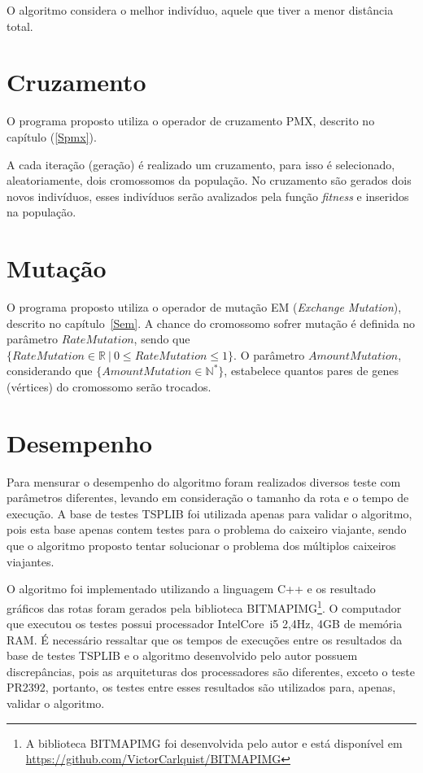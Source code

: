 \documentclass[12pt,openright,a4paper,oneside]{tcc}
\begin{document}
		O algoritmo considera o melhor indivíduo, aquele que tiver a menor distância total. 

		\section{Cruzamento}

			O programa proposto utiliza o operador de cruzamento PMX, descrito no capítulo (\ref{Spmx}). 
			
			A cada iteração (geração) é realizado um cruzamento, para isso é selecionado, aleatoriamente, dois cromossomos da população. No cruzamento são gerados dois novos indivíduos, esses indivíduos serão avalizados pela função \textit{fitness} e inseridos na população.

		\section{Mutação}

			O programa proposto utiliza o operador de mutação EM (\textit{Exchange Mutation}), descrito no capítulo~\ref{Sem}. A chance do cromossomo sofrer mutação é definida no parâmetro $RateMutation$, sendo que $\{RateMutation \in \mathbb{R}~|~ 0 \leq RateMutation \leq 1\}$. O parâmetro  $AmountMutation$, considerando que  $\{AmountMutation \in \mathbb{N}^*\}$, estabelece quantos pares de genes (vértices) do cromossomo serão trocados.
						
		
			
		\section{Desempenho}
		
		Para mensurar o desempenho do algoritmo foram realizados diversos teste com parâmetros diferentes, levando em consideração o tamanho da rota e o tempo de execução. A base de testes TSPLIB foi utilizada apenas para validar o algoritmo, pois esta base apenas contem testes para o problema do caixeiro viajante, sendo que o algoritmo proposto tentar solucionar o problema dos múltiplos caixeiros viajantes. 
		
		O algoritmo foi implementado utilizando a linguagem C++ e os resultado gráficos das rotas foram gerados pela biblioteca BITMAPIMG\footnote{A biblioteca BITMAPIMG foi desenvolvida pelo autor e está disponível em \url{https://github.com/VictorCarlquist/BITMAPIMG}}.
		O computador que executou os testes possui processador Intel\textregistered Core\texttrademark ~i5 2,4Hz, 4GB de memória RAM. É necessário ressaltar que os tempos de execuções entre os resultados da base de testes TSPLIB e o algoritmo desenvolvido pelo autor possuem discrepâncias, pois as arquiteturas dos processadores são diferentes, exceto o teste PR2392, portanto, os testes entre esses resultados são utilizados para, apenas, validar o algoritmo.
\end{document}
